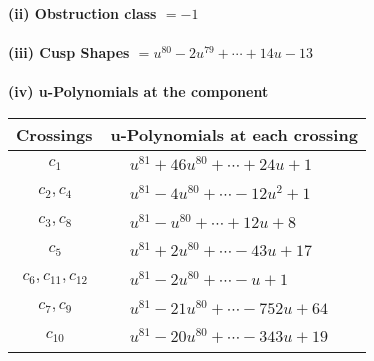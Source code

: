 \documentclass[1p]{elsarticle_modified}
\theoremstyle{definition}
\begin{document}
\flushleft \textbf{(ii) Obstruction class $= -1$}\\~\\
\flushleft \textbf{(iii) Cusp Shapes $= u^{80}-2 u^{79}+\cdots+14 u-13$}\\~\\
\newpage\renewcommand{\arraystretch}{1}
\flushleft \textbf{(iv) u-Polynomials at the component}\newline \\
\begin{tabular}{m{50pt}|m{274pt}}
Crossings & \hspace{64pt}u-Polynomials at each crossing \\
\hline $$\begin{aligned}c_{1}\end{aligned}$$&$\begin{aligned}
&u^{81}+46 u^{80}+\cdots+24 u+1
\end{aligned}$\\
\hline $$\begin{aligned}c_{2},c_{4}\end{aligned}$$&$\begin{aligned}
&u^{81}-4 u^{80}+\cdots-12 u^2+1
\end{aligned}$\\
\hline $$\begin{aligned}c_{3},c_{8}\end{aligned}$$&$\begin{aligned}
&u^{81}- u^{80}+\cdots+12 u+8
\end{aligned}$\\
\hline $$\begin{aligned}c_{5}\end{aligned}$$&$\begin{aligned}
&u^{81}+2 u^{80}+\cdots-43 u+17
\end{aligned}$\\
\hline $$\begin{aligned}c_{6},c_{11},c_{12}\end{aligned}$$&$\begin{aligned}
&u^{81}-2 u^{80}+\cdots- u+1
\end{aligned}$\\
\hline $$\begin{aligned}c_{7},c_{9}\end{aligned}$$&$\begin{aligned}
&u^{81}-21 u^{80}+\cdots-752 u+64
\end{aligned}$\\
\hline $$\begin{aligned}c_{10}\end{aligned}$$&$\begin{aligned}
&u^{81}-20 u^{80}+\cdots-343 u+19
\end{aligned}$\\
\hline
\end{tabular}\\~\\
\end{document}
